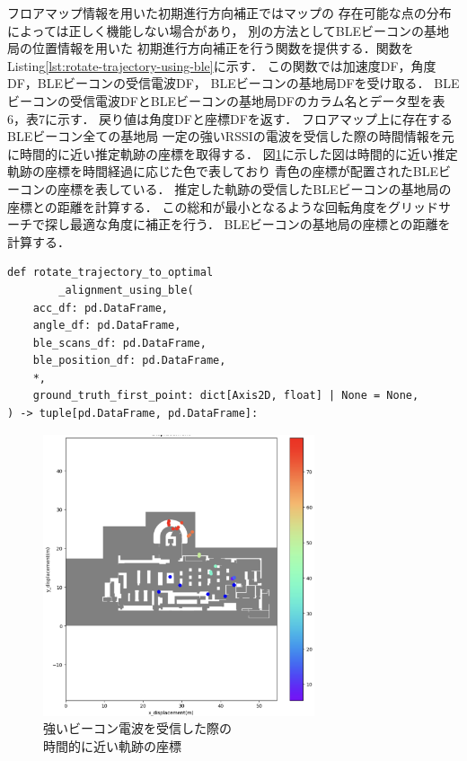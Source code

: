 フロアマップ情報を用いた初期進行方向補正ではマップの
存在可能な点の分布によっては正しく機能しない場合があり，
別の方法としてBLEビーコンの基地局の位置情報を用いた
初期進行方向補正を行う関数を提供する．関数をListing\ref{lst:rotate-trajectory-using-ble}に示す．
この関数では加速度DF，角度DF，BLEビーコンの受信電波DF， BLEビーコンの基地局DFを受け取る．
BLEビーコンの受信電波DFとBLEビーコンの基地局DFのカラム名とデータ型を表6，表7に示す．
戻り値は角度DFと座標DFを返す．
フロアマップ上に存在するBLEビーコン全ての基地局
一定の強いRSSIの電波を受信した際の時間情報を元に時間的に近い推定軌跡の座標を取得する．
図\ref{fig:ble-merge}に示した図は時間的に近い推定軌跡の座標を時間経過に応じた色で表しており
青色の座標が配置されたBLEビーコンの座標を表している．
推定した軌跡の受信したBLEビーコンの基地局の座標との距離を計算する．
この総和が最小となるような回転角度をグリッドサーチで探し最適な角度に補正を行う．
BLEビーコンの基地局の座標との距離を計算する．

\begin{lstlisting}[caption={BLEビーコンの基地局の位置情報を使用した初期進行方向補正}, label=lst:rotate-trajectory-using-ble]
def rotate_trajectory_to_optimal
		_alignment_using_ble(
    acc_df: pd.DataFrame,
    angle_df: pd.DataFrame,
    ble_scans_df: pd.DataFrame,
    ble_position_df: pd.DataFrame,
    *,
    ground_truth_first_point: dict[Axis2D, float] | None = None,
) -> tuple[pd.DataFrame, pd.DataFrame]:
\end{lstlisting}


\begin{figure}[ht]
	\centering
	\includegraphics[width=80mm]{image/ble-merge.jpg}
	\caption{強いビーコン電波を受信した際の\\時間的に近い軌跡の座標}    \label{fig:ble-merge}
\end{figure}

